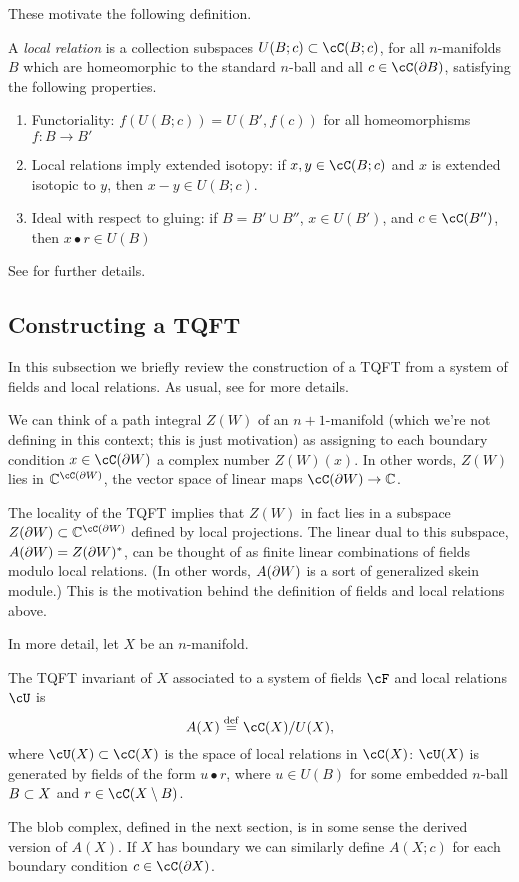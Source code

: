 These motivate the following definition.

\begin{defn}
A {\it local relation} is a collection subspaces $U(B; c) \sub \lf(B; c)$,
for all $n$-manifolds $B$ which are
homeomorphic to the standard $n$-ball and all $c \in \cC(\bd B)$, 
satisfying the following properties.
\begin{enumerate}
\item Functoriality: 
$f(U(B; c)) = U(B', f(c))$ for all homeomorphisms $f: B \to B'$
\item Local relations imply extended isotopy: 
if $x, y \in \cC(B; c)$ and $x$ is extended isotopic 
to $y$, then $x-y \in U(B; c)$.
\item Ideal with respect to gluing:
if $B = B' \cup B''$, $x\in U(B')$, and $c\in \cC(B'')$, then $x\bullet r \in U(B)$
\end{enumerate}
\end{defn}
See \cite{kw:tqft} for further details.


\subsection{Constructing a TQFT}
\label{sec:constructing-a-tqft}

In this subsection we briefly review the construction of a TQFT from a system of fields and local relations.
As usual, see \cite{kw:tqft} for more details.

We can think of a path integral $Z(W)$ of an $n+1$-manifold 
(which we're not defining in this context; this is just motivation) as assigning to each
boundary condition $x\in \cC(\bd W)$ a complex number $Z(W)(x)$.
In other words, $Z(W)$ lies in $\c^{\lf(\bd W)}$, the vector space of linear
maps $\lf(\bd W)\to \c$.

The locality of the TQFT implies that $Z(W)$ in fact lies in a subspace
$Z(\bd W) \sub \c^{\lf(\bd W)}$ defined by local projections.
The linear dual to this subspace, $A(\partial W) = Z(\partial W)^*$,
can be thought of as finite linear combinations of fields modulo local relations.
(In other words, $A(\partial W)$ is a sort of generalized skein module.)
This is the motivation behind the definition of fields and local relations above.

In more detail, let $X$ be an $n$-manifold.
\begin{defn}
\label{defn:TQFT-invariant}
The TQFT invariant of $X$ associated to a system of fields $\cF$ and local relations $\cU$ is 
	$$A(X) \deq \lf(X) / U(X),$$
where $\cU(X) \sub \lf(X)$ is the space of local relations in $\lf(X)$:
$\cU(X)$ is generated by fields of the form $u\bullet r$, where
$u\in U(B)$ for some embedded $n$-ball $B\subset X$ and $r\in \cC(X\setmin B)$.
\end{defn}
The blob complex, defined in the next section, 
is in some sense the derived version of $A(X)$.
If $X$ has boundary we can similarly define $A(X; c)$ for each 
boundary condition $c\in\cC(\bd X)$.

